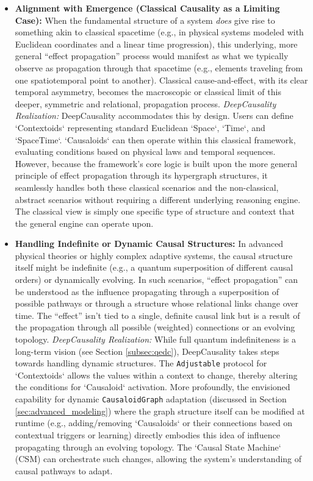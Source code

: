 \begin{itemize}
    \item \textbf{Alignment with Emergence (Classical Causality as a Limiting Case):}
    When the fundamental structure of a system \textit{does} give rise to something akin to classical spacetime (e.g., in physical systems modeled with Euclidean coordinates and a linear time progression), this underlying, more general ``effect propagation'' process would manifest as what we typically observe as propagation through that spacetime (e.g., elements traveling from one spatiotemporal point to another). Classical cause-and-effect, with its clear temporal asymmetry, becomes the macroscopic or classical limit of this deeper, symmetric and relational, propagation process.
    \textit{DeepCausality Realization:} DeepCausality accommodates this by design. Users can define `Contextoids` representing standard Euclidean `Space`, `Time`, and `SpaceTime`. `Causaloids` can then operate within this classical framework, evaluating conditions based on physical laws and temporal sequences. However, because the framework's core logic is built upon the more general principle of effect propagation through its hypergraph structures, it seamlessly handles both these classical scenarios and the non-classical, abstract scenarios without requiring a different underlying reasoning engine. The classical view is simply one specific type of structure and context that the general engine can operate upon.

    \item \textbf{Handling Indefinite or Dynamic Causal Structures:}
    In advanced physical theories or highly complex adaptive systems, the causal structure itself might be indefinite (e.g., a quantum superposition of different causal orders) or dynamically evolving. In such scenarios, ``effect propagation'' can be understood as the influence propagating through a superposition of possible pathways or through a structure whose relational links change over time. The ``effect'' isn't tied to a single, definite causal link but is a result of the propagation through all possible (weighted) connections or an evolving topology.
    \textit{DeepCausality Realization:} While full quantum indefiniteness is a long-term vision (see Section \ref{subsec:qedc}), DeepCausality takes steps towards handling dynamic structures. The \texttt{Adjustable} protocol for `Contextoids` allows the values within a context to change, thereby altering the conditions for `Causaloid` activation. More profoundly, the envisioned capability for dynamic \texttt{CausaloidGraph} adaptation (discussed in Section \ref{sec:advanced_modeling}) where the graph structure itself can be modified at runtime (e.g., adding/removing `Causaloids` or their connections based on contextual triggers or learning) directly embodies this idea of influence propagating through an evolving topology. The `Causal State Machine` (CSM) can orchestrate such changes, allowing the system's understanding of causal pathways to adapt.
\end{itemize}

